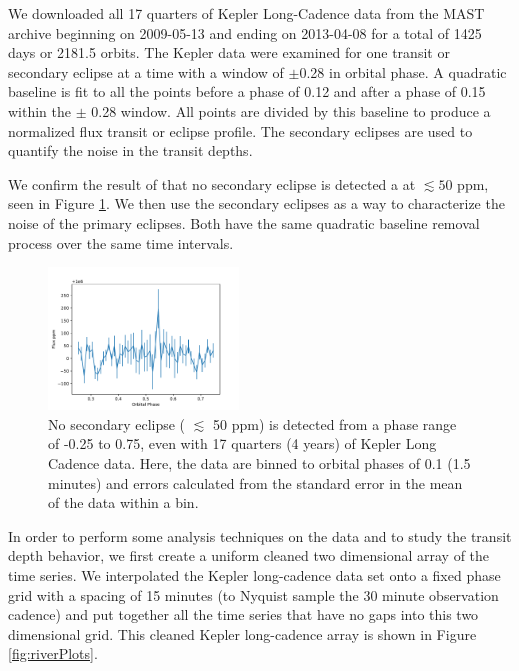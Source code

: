 \documentclass[preprint]{aastex61}
\begin{document}
We downloaded all 17 quarters of Kepler Long-Cadence data from the MAST archive beginning on 2009-05-13 and ending on 2013-04-08 for a total of 1425 days or 2181.5 orbits.
The Kepler data were examined for one transit or secondary eclipse at a time with a window of $\pm$0.28 in orbital phase.
A quadratic baseline is fit to all the points before a phase of 0.12 and after a phase of 0.15 within the $\pm$ 0.28 window.
All points are divided by this baseline to produce a normalized flux transit or eclipse profile.
The secondary eclipses are used to quantify the noise in the transit depths.

We confirm the result of \citet{vanWerkhoven2014} that no secondary eclipse is detected a at $\lesssim 50$ ppm, seen in Figure \ref{fig:secEclipse}. 
We then use the secondary eclipses as a way to characterize the noise of the primary eclipses.
Both have the same quadratic baseline removal process over the same time intervals.

\begin{figure}[!hbtp]
\begin{centering}
\includegraphics[width=0.45\textwidth]{images/kepler/secondary_eclipse.pdf}
\caption{No secondary eclipse ( $\lesssim$ 50 ppm) is detected from a phase range of -0.25 to 0.75, even with 17 quarters (4 years) of Kepler Long Cadence data.
Here, the data are binned to orbital phases of 0.1 (1.5 minutes) and errors calculated from the standard error in the mean of the data within a bin.
}\label{fig:secEclipse}
\end{centering}
\end{figure}

In order to perform some analysis techniques on the data and to study the transit depth behavior, we first create a uniform cleaned two dimensional array of the time series.
We interpolated the Kepler long-cadence data set onto a fixed phase grid with a spacing of 15 minutes (to Nyquist sample the 30 minute observation cadence) and put together all the time series that have no gaps into this two dimensional grid.
This cleaned Kepler long-cadence array is shown in Figure \ref{fig:riverPlots}.
\end{document}
